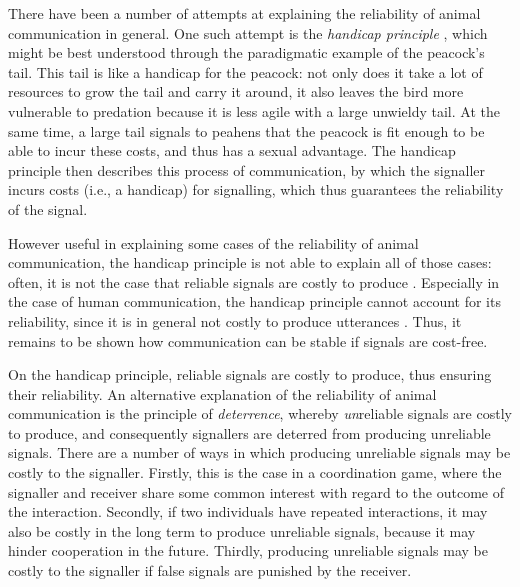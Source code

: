 There have been a number of attempts at explaining the reliability of animal communication in general. One such attempt is the \emph{handicap principle} \citep{Zahavi75, Zahavi99}, which might be best understood through the paradigmatic example of the peacock's tail. This tail is like a handicap for the peacock: not only does it take a lot of resources to grow the tail and carry it around, it also leaves the bird more vulnerable to predation because it is less agile with a large unwieldy tail. At the same time, a large tail signals to peahens that the peacock is fit enough to be able to incur these costs, and thus has a sexual advantage.
The handicap principle then describes this process of communication, by which the signaller incurs costs (i.e., a handicap) for signalling, which thus guarantees the reliability of the signal.

However useful in explaining some cases of the reliability of animal communication, the handicap principle is not able to explain all of those cases: often, it is not the case that reliable signals are costly to produce \citep{Scott-Phillips08} . Especially in the case of human communication, the handicap principle cannot account for its reliability, since it is in general not costly to produce utterances \citep{Scott-Phillips08}.
Thus, it remains to be shown how communication can be stable if signals are cost-free.

On the handicap principle, reliable signals are costly to produce, thus ensuring their reliability. An alternative explanation of the reliability of animal communication is the principle of \emph{deterrence}, whereby \emph{un}reliable signals are costly to produce, and consequently signallers are deterred from producing unreliable signals.
There are a number of ways in which producing unreliable signals may be costly to the signaller. Firstly, this is the case in a coordination game, where the signaller and receiver share some common interest with regard to the outcome of the interaction.
Secondly, if two individuals have repeated interactions, it may also be costly in the long term to produce unreliable signals, because it may hinder cooperation in the future.
Thirdly, producing unreliable signals may be costly to the signaller if false signals are punished by the receiver.

